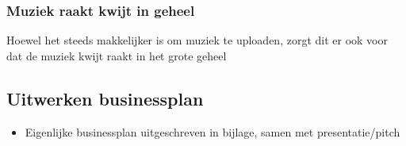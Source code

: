\subsubsection{Muziek raakt kwijt in geheel}
\begin{quotebox}
Hoewel het steeds makkelijker is om muziek te uploaden, zorgt dit er ook voor dat de muziek kwijt raakt in het grote geheel
\end{quotebox}

\subsection {Uitwerken businessplan}

\begin{itemize}
  \item Eigenlijke businessplan uitgeschreven in bijlage, samen met presentatie/pitch
\end{itemize}
% 
